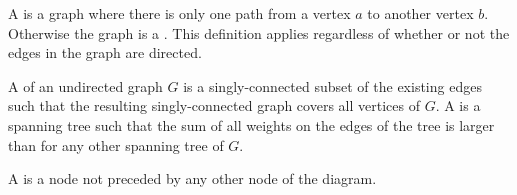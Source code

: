 \begin{defi}
A  is a graph where there is only one path from a vertex $a$ to another vertex $b$. Otherwise the graph is a . This definition applies regardless of whether or not the edges in the graph are directed.
\cite{Barber2011}
\end{defi}

\begin{defi}
A  of an undirected graph $G$ is a singly-connected subset of the existing edges such that the resulting singly-connected graph covers all vertices of $G$. A  is a spanning tree such that the sum of all weights on the edges of the tree is larger than for any other spanning tree of $G$.
\cite{Barber2011}
\end{defi}

\begin{defi}
A  is a node not preceded by any other node of the diagram.
\cite{conf/fedcsis/Kulikowski12}
\end{defi}